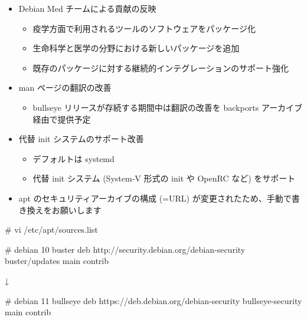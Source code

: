\documentclass[mingoth,a4paper]{jsarticle}
\begin{document}



  
\begin{itemize}
\item Debian Med チームによる貢献の反映
  \begin{itemize}
  \item 疫学方面で利用されるツールのソフトウェアをパッケージ化
  \item 生命科学と医学の分野における新しいパッケージを追加
  \item 既存のパッケージに対する継続的インテグレーションのサポート強化
  \end{itemize}
\item man ページの翻訳の改善
  \begin{itemize}
  \item bullseye リリースが存続する期間中は翻訳の改善を backports アーカイブ経由で提供予定
  \end{itemize}
\item 代替 init システムのサポート改善
  \begin{itemize}
  \item デフォルトは systemd
  \item 代替 init システム (System-V 形式の init や OpenRC など) をサポート
  \end{itemize}
\end{itemize}





\begin{itemize}
\item apt のセキュリティアーカイブの構成 (=URL) が変更されたため、手動で書き換えをお願いします
\end{itemize}

\begin{commandline}
# vi /etc/apt/sources.list
  
# debian 10 buster
deb http://security.debian.org/debian-security buster/updates main contrib

↓

# debian 11 bullseye
deb https://deb.debian.org/debian-security bullseye-security main contrib
\end{commandline}
\end{document}
